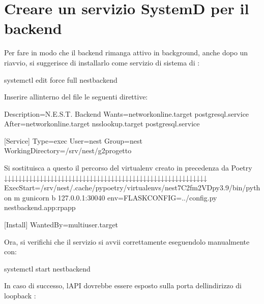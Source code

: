 \documentclass[letterpaper,10pt,italian]{sphinxmanual}
\begin{document}
\section{Creare un servizio SystemD per il backend}
\label{\detokenize{guide/installation:creare-un-servizio-systemd-per-il-backend}}
\sphinxAtStartPar
Per fare in modo che il backend rimanga attivo in background, anche dopo un riavvio, si suggerisce di installarlo come
servizio di sistema di :

\begin{sphinxVerbatim}[commandchars=\\\{\}]
systemctl edit \PYGZhy{}\PYGZhy{}force \PYGZhy{}\PYGZhy{}full nest\PYGZhy{}backend
\end{sphinxVerbatim}

\sphinxAtStartPar
Inserire all\textquotesingle{}interno del file le seguenti direttive:

\begin{sphinxVerbatim}[commandchars=\\\{\}]
[Unit]
Description=N.E.S.T. Backend
Wants=network\PYGZhy{}online.target postgresql.service
After=network\PYGZhy{}online.target nss\PYGZhy{}lookup.target postgresql.service

[Service]
Type=exec
User=nest
Group=nest
WorkingDirectory=/srv/nest/g2\PYGZhy{}progetto

\PYGZsh{} Si sostituisca a questo il percorso del virtualenv creato in precedenza da Poetry
\PYGZsh{}         ↓↓↓↓↓↓↓↓↓↓↓↓↓↓↓↓↓↓↓↓↓↓↓↓↓↓↓↓↓↓↓↓↓↓↓↓↓↓↓↓↓↓↓↓↓↓↓↓↓↓↓↓↓↓↓↓↓
ExecStart=/srv/nest/.cache/pypoetry/virtualenvs/nest\PYGZhy{}7C2fm2VD\PYGZhy{}py3.9/bin/python \PYGZhy{}m gunicorn \PYGZhy{}b 127.0.0.1:30040 \PYGZhy{}\PYGZhy{}env=\PYGZdq{}FLASK\PYGZus{}CONFIG=../config.py\PYGZdq{} nest\PYGZus{}backend.app:rp\PYGZus{}app

[Install]
WantedBy=multi\PYGZhy{}user.target
\end{sphinxVerbatim}

\sphinxAtStartPar
Ora, si verifichi che il servizio si avvii correttamente eseguendolo manualmente con:

\begin{sphinxVerbatim}[commandchars=\\\{\}]
systemctl start nest\PYGZhy{}backend
\end{sphinxVerbatim}

\sphinxAtStartPar
In caso di successo, l\textquotesingle{}API dovrebbe essere esposto sulla porta  dell\textquotesingle{}indirizzo di loopback :
\end{document}

